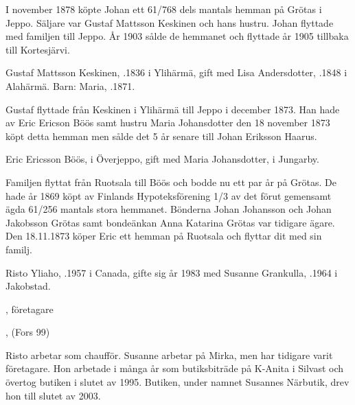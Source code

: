 I november 1878 köpte Johan ett 61/768 dels mantals hemman på Grötas i Jeppo. Säljare var Gustaf Mattsson Keskinen och hans hustru. Johan flyttade med familjen till Jeppo. År 1903 sålde de hemmanet och flyttade år 1905 tillbaka till Kortesjärvi.


Gustaf Mattsson Keskinen, .1836  i Ylihärmä, gift med Lisa Andersdotter, .1848 i Alahärmä.
Barn: Maria, .1871.

Gustaf flyttade från Keskinen i Ylihärmä till Jeppo i december 1873. Han hade av Eric Ericson Böös samt hustru Maria Johansdotter den 18 november 1873 köpt detta hemman men sålde det 5 år senare till Johan Eriksson Haarus.


Eric Ericsson Böös,  i Överjeppo, gift med Maria Johansdotter,  i Jungarby.
\begin{jhchildren}
  \item {}
  \item {}
\end{jhchildren}

Familjen flyttat från Ruotsala till Böös och bodde nu ett par år på Grötas. De hade år 1869 köpt av Finlands Hypoteksförening 1/3 av det förut gemensamt ägda 61/256 mantals stora hemmanet. Bönderna Johan Johansson och Johan Jakobsson Grötas samt bondeänkan Anna Katarina Grötas var tidigare ägare. Den 18.11.1873 köper Eric ett hemman på Ruotsala och flyttar dit med sin familj.






Risto Yliaho, .1957 i Canada, gifte sig år 1983 med Susanne Grankulla, .1964 i Jakobstad.
\begin{jhchildren}
  \item {}, företagare
  \item {}, (Fors 99)
\end{jhchildren}

Risto arbetar som chaufför. Susanne arbetar på Mirka, men har tidigare varit företagare. Hon arbetade i många år som butiksbiträde på K-Anita i Silvast och övertog butiken i slutet av 1995. Butiken, under namnet Susannes Närbutik, drev hon till slutet av 2003.

